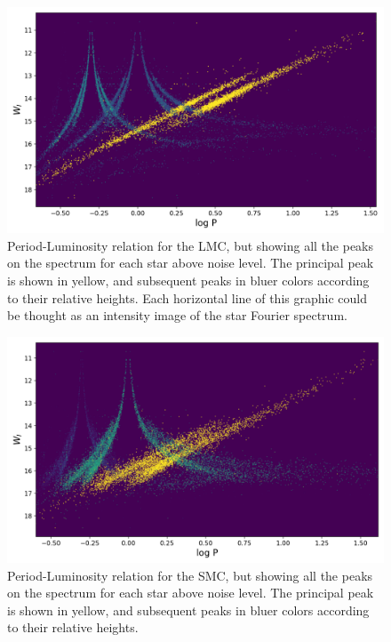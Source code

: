 \begin{figure}[H]
	\centering
	\includegraphics[width=\textwidth]{img/lmc.png}
	\caption[PL relation with secondary peaks for the LMC]{
		Period-Luminosity relation for the LMC, but showing all the peaks on the spectrum for each star above noise level. 
		The principal peak is shown in yellow, and subsequent peaks in bluer colors according to their relative heights.
		Each horizontal line of this graphic could be thought as an intensity image of the star Fourier spectrum.
	}
	\label{fig:color-pl-lmc}
\end{figure}


\begin{figure}[H]
	\centering
	\includegraphics[width=\textwidth]{img/smc.png}
	\caption[PL relation with secondary peaks for the SMC]{
		Period-Luminosity relation for the SMC, but showing all the peaks on the spectrum for each star above noise level. 
		The principal peak is shown in yellow, and subsequent peaks in bluer colors according to their relative heights.
	}
	\label{fig:color-pl-smc}
\end{figure}



